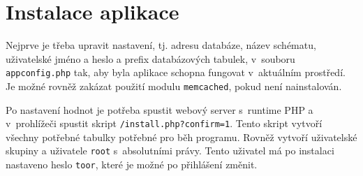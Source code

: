 \section{Instalace aplikace}

Nejprve je třeba upravit nastavení, tj. adresu databáze, název schématu,
uživatelské jméno a heslo a prefix databázových tabulek, v~souboru
\verb|appconfig.php| tak, aby byla aplikace schopna fungovat v~aktuálním
prostředí. Je možné rovněž zakázat použití modulu \verb|memcached|, pokud
není nainstalován.

Po nastavení hodnot je potřeba spustit webový server s~runtime PHP
a v~prohlížeči spustit skript \verb|/install.php?confirm=1|. Tento skript
vytvoří všechny potřebné tabulky potřebné pro běh programu. Rovněž vytvoří
uživatelské skupiny a uživatele \verb|root| s~absolutními právy. Tento uživatel
má po instalaci nastaveno heslo \verb|toor|, které je možné po přihlášení změnit.
